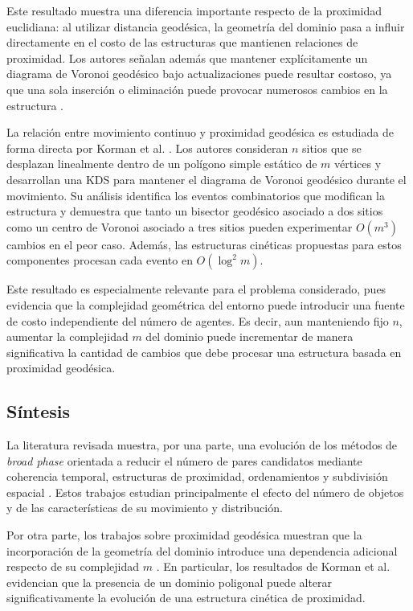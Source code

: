 \documentclass[12pt]{article}
\begin{document}
Este resultado muestra una diferencia importante respecto de la proximidad euclidiana: al utilizar distancia geodésica, la geometría del dominio pasa a influir directamente en el costo de las estructuras que mantienen relaciones de proximidad. Los autores señalan además que mantener explícitamente un diagrama de Voronoi geodésico bajo actualizaciones puede resultar costoso, ya que una sola inserción o eliminación puede provocar numerosos cambios en la estructura \cite{agarwal2018dynamic}.

La relación entre movimiento continuo y proximidad geodésica es estudiada de forma directa por Korman et al. \cite{korman2023kinetic}. Los autores consideran \(n\) sitios que se desplazan linealmente dentro de un polígono simple estático de \(m\) vértices y desarrollan una KDS para mantener el diagrama de Voronoi geodésico durante el movimiento. Su análisis identifica los eventos combinatorios que modifican la estructura y demuestra que tanto un bisector geodésico asociado a dos sitios como un centro de Voronoi asociado a tres sitios pueden experimentar \(O(m^3)\) cambios en el peor caso. Además, las estructuras cinéticas propuestas para estos componentes procesan cada evento en \(O(\log^2 m)\).

Este resultado es especialmente relevante para el problema considerado, pues evidencia que la complejidad geométrica del entorno puede introducir una fuente de costo independiente del número de agentes. Es decir, aun manteniendo fijo \(n\), aumentar la complejidad \(m\) del dominio puede incrementar de manera significativa la cantidad de cambios que debe procesar una estructura basada en proximidad geodésica.

\subsection{Síntesis}

La literatura revisada muestra, por una parte, una evolución de los métodos de \textit{broad phase} orientada a reducir el número de pares candidatos mediante coherencia temporal, estructuras de proximidad, ordenamientos y subdivisión espacial \cite{cohen1995icollide,guibas2001kinetic,gavrilova2003collision,serpa2019flexible,cao2023fast}. Estos trabajos estudian principalmente el efecto del número de objetos y de las características de su movimiento y distribución.

Por otra parte, los trabajos sobre proximidad geodésica muestran que la incorporación de la geometría del dominio introduce una dependencia adicional respecto de su complejidad \(m\) \cite{agarwal2018dynamic,korman2023kinetic}. En particular, los resultados de Korman et al. \cite{korman2023kinetic} evidencian que la presencia de un dominio poligonal puede alterar significativamente la evolución de una estructura cinética de proximidad.
\end{document}
